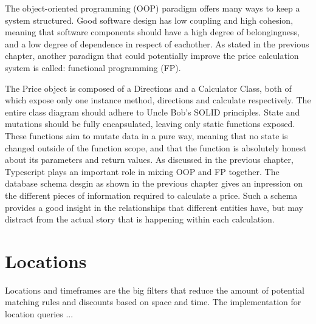 The object-oriented programming (OOP) paradigm offers many ways to keep a system structured. Good software design has low coupling and high cohesion, meaning that software components should have a high degree of belongingness, and a low degree of dependence in respect of eachother. As stated in the previous chapter, another paradigm that could potentially improve the price calculation system is called: functional programming (FP).


The Price object is composed of a Directions and a Calculator Class, both of which expose only one instance method, directions and calculate respectively. The entire class diagram should adhere to Uncle Bob's SOLID principles. State and mutations should be fully encapsulated, leaving only static functions exposed. These functions aim to mutate data in a pure way, meaning that no state is changed outside of the function scope, and that the function is absolutely honest about its parameters and return values. As discussed in the previous chapter, Typescript plays an important role in mixing OOP and FP together. The database schema desgin as shown in the previous chapter gives an inpression on the different pieces of information required to calculate a price. Such a schema provides a good insight in the relationships that different entities have, but may distract from the actual story that is happening within each calculation.


\section{Locations}
Locations and timeframes are the big filters that reduce the amount of potential matching rules and discounts based on space and time. The implementation for location queries ...


